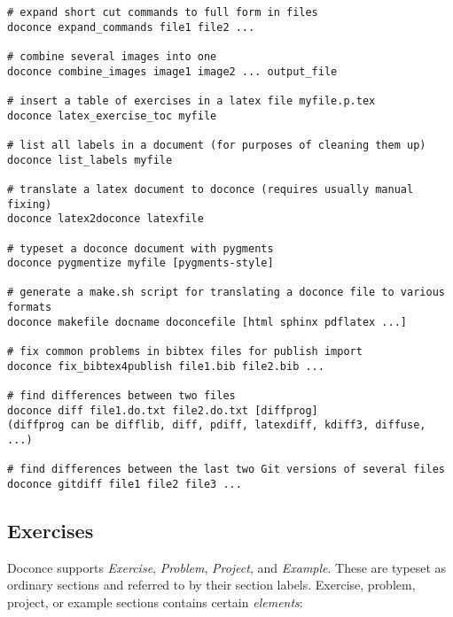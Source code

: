 \documentclass[%
oneside,                 %
final,                   %
10pt]{article}
\begin{document}
\begin{Verbatim}[numbers=none,fontsize=\fontsize{9pt}{9pt},baselinestretch=0.85,xleftmargin=0mm]
# expand short cut commands to full form in files
doconce expand_commands file1 file2 ...

# combine several images into one
doconce combine_images image1 image2 ... output_file

# insert a table of exercises in a latex file myfile.p.tex
doconce latex_exercise_toc myfile

# list all labels in a document (for purposes of cleaning them up)
doconce list_labels myfile

# translate a latex document to doconce (requires usually manual fixing)
doconce latex2doconce latexfile

# typeset a doconce document with pygments
doconce pygmentize myfile [pygments-style]

# generate a make.sh script for translating a doconce file to various formats
doconce makefile docname doconcefile [html sphinx pdflatex ...]

# fix common problems in bibtex files for publish import
doconce fix_bibtex4publish file1.bib file2.bib ...

# find differences between two files
doconce diff file1.do.txt file2.do.txt [diffprog]
(diffprog can be difflib, diff, pdiff, latexdiff, kdiff3, diffuse, ...)

# find differences between the last two Git versions of several files
doconce gitdiff file1 file2 file3 ...
\end{Verbatim}

\subsection{Exercises}

Doconce supports \emph{Exercise}, \emph{Problem}, \emph{Project}, and \emph{Example}.
These are typeset
as ordinary sections and referred to by their section labels.
Exercise, problem, project, or example sections contains certain \emph{elements}:
\end{document}
